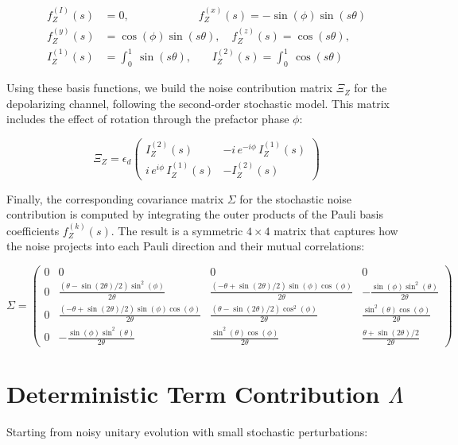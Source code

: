 \documentclass[9pt,a4paper,twocolumn,twoside]{tau-class/tau}
\begin{document}
\begin{align}
f_Z^{(I)}(s) &= 0, \quad\quad\quad\quad\quad\quad\
f_Z^{(x)}(s) = -\sin(\phi)\sin(s\theta) \\
f_Z^{(y)}(s) &= \cos(\phi)\sin(s\theta), \quad 
f_Z^{(z)}(s) = \cos(s\theta), \\
I_Z^{(1)}(s) &= \int_0^1\ \sin(s\theta), \quad \;\;\;
I_Z^{(2)}(s) = \int_0^1 \ \cos(s\theta)
    \label{eq: f_z}
\end{align}

Using these basis functions, we build the noise contribution matrix \( \Xi_Z \) for the depolarizing channel, following the second-order stochastic model. This matrix includes the effect of rotation through the prefactor phase \( \phi \):

\begin{equation}
    \Xi_Z = \epsilon_d \begin{pmatrix}
I_Z^{(2)}(s) & -i \, e^{-i\phi} \, I_Z^{(1)}(s) \\
i \, e^{i\phi} \, I_Z^{(1)}(s) & -I_Z^{(2)}(s)
\end{pmatrix}
\end{equation}

Finally, the corresponding covariance matrix \( \Sigma \) for the stochastic noise contribution is computed by integrating the outer products of the Pauli basis coefficients \( f_Z^{(k)}(s) \). The result is a symmetric \(4 \times 4\) matrix that captures how the noise projects into each Pauli direction and their mutual correlations:

\begin{equation}
    \Sigma =
\begin{pmatrix}
0 & 0 & 0 & 0 \\
0 & \frac{(\theta - \sin(2\theta)/2)\sin^2(\phi)}{2\theta} & \frac{(-\theta + \sin(2\theta)/2)\sin(\phi)\cos(\phi)}{2\theta} & -\frac{\sin(\phi)\sin^2(\theta)}{2\theta} \\
0 & \frac{(-\theta + \sin(2\theta)/2)\sin(\phi)\cos(\phi)}{2\theta} & \frac{(\theta - \sin(2\theta)/2)\cos^2(\phi)}{2\theta} & \frac{\sin^2(\theta)\cos(\phi)}{2\theta} \\
0 & -\frac{\sin(\phi)\sin^2(\theta)}{2\theta} & \frac{\sin^2(\theta)\cos(\phi)}{2\theta} & \frac{\theta + \sin(2\theta)/2}{2\theta}
\end{pmatrix}
\end{equation}

\section{ Deterministic Term Contribution \( \Lambda \)}
Starting from noisy unitary evolution with small stochastic perturbations:
\end{document}
